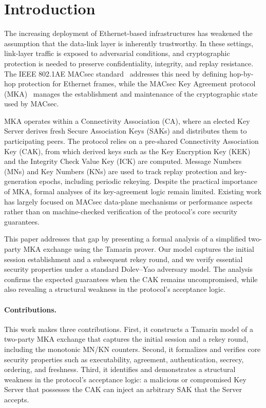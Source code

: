 
\section{Introduction}
The increasing deployment of Ethernet-based infrastructures has weakened the assumption that the data-link layer is inherently trustworthy. In these settings, link-layer traffic is exposed to adversarial conditions, and cryptographic protection is needed to preserve confidentiality, integrity, and replay resistance. The IEEE 802.1AE MACsec standard~\cite{ieee8021ae} addresses this need by defining hop-by-hop protection for Ethernet frames, while the MACsec Key Agreement protocol (MKA)~\cite{ieee8021x} manages the establishment and maintenance of the cryptographic state used by MACsec.

MKA operates within a Connectivity Association (CA), where an elected Key Server derives fresh Secure Association Keys (SAKs) and distributes them to participating peers. The protocol relies on a pre-shared Connectivity Association Key (CAK), from which derived keys such as the Key Encryption Key (KEK) and the Integrity Check Value Key (ICK) are computed. Message Numbers (MNs) and Key Numbers (KNs) are used to track replay protection and key-generation epochs, including periodic rekeying. Despite the practical importance of MKA, formal analyses of its key-agreement logic remain limited. Existing work has largely focused on MACsec data-plane mechanisms or performance aspects rather than on machine-checked verification of the protocol's core security guarantees.

This paper addresses that gap by presenting a formal analysis of a simplified two-party MKA exchange using the Tamarin prover. Our model captures the initial session establishment and a subsequent rekey round, and we verify essential security properties under a standard Dolev--Yao adversary model. The analysis confirms the expected guarantees when the CAK remains uncompromised, while also revealing a structural weakness in the protocol's acceptance logic.

\paragraph{Contributions.} This work makes three contributions. First, it constructs a Tamarin model of a two-party MKA exchange that captures the initial session and a rekey round, including the monotonic MN/KN counters. Second, it formalizes and verifies core security properties such as executability, agreement, authentication, secrecy, ordering, and freshness. Third, it identifies and demonstrates a structural weakness in the protocol's acceptance logic: a malicious or compromised Key Server that possesses the CAK can inject an arbitrary SAK that the Server accepts.

